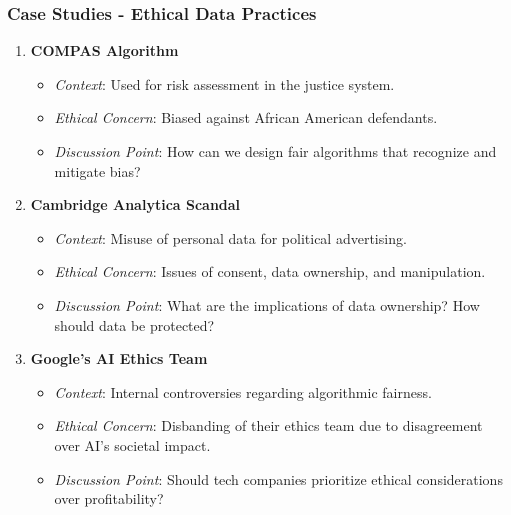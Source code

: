 \documentclass[aspectratio=169]{beamer}
\begin{document}
\begin{frame}[fragile]
    \frametitle{Case Studies - Ethical Data Practices}
    \begin{enumerate}
        \item \textbf{COMPAS Algorithm}
            \begin{itemize}
                \item \textit{Context}: Used for risk assessment in the justice system.
                \item \textit{Ethical Concern}: Biased against African American defendants.
                \item \textit{Discussion Point}: How can we design fair algorithms that recognize and mitigate bias?
            \end{itemize}
        
        \item \textbf{Cambridge Analytica Scandal}
            \begin{itemize}
                \item \textit{Context}: Misuse of personal data for political advertising.
                \item \textit{Ethical Concern}: Issues of consent, data ownership, and manipulation.
                \item \textit{Discussion Point}: What are the implications of data ownership? How should data be protected?
            \end{itemize}
        
        \item \textbf{Google’s AI Ethics Team}
            \begin{itemize}
                \item \textit{Context}: Internal controversies regarding algorithmic fairness.
                \item \textit{Ethical Concern}: Disbanding of their ethics team due to disagreement over AI's societal impact.
                \item \textit{Discussion Point}: Should tech companies prioritize ethical considerations over profitability?
            \end{itemize}
    \end{enumerate}
\end{frame}
\end{document}
